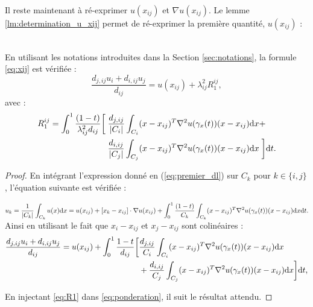 \documentclass[12pt,a4paper]{article}
\begin{document}
   Il reste maintenant à ré-exprimer $u(x_{ij})$ et $\nabla u(x_{ij})$. Le lemme \ref{lm:determination_u_xij} permet de ré-exprimer la première quantité, $u(x_{ij})$ : 
   
   
   \begin{lm}[Détermination de $u(x_{ij})$]$ $\label{lm:determination_u_xij}\\
   		En utilisant les notations introduites dans la Section \ref{sec:notations}, la formule \eqref{eq:xij} est vérifiée :
	   	\begin{equation}\label{eq:xij}
	   		\dfrac{d_{j,ij}u_i + d_{i,ij}u_j}{d_{ij}} = u(  x_{ij}) + \lambda_{ij}^2R_1^{ij},
	   	\end{equation}
	   	avec : 
   		\begin{equation}\label{eq:R1}
   			\begin{aligned}
   				R_1^{ij} =\displaystyle\int_0^1 \dfrac{(1-t)}{\lambda_{ij}^2d_{ij}}\bigg[\;&\dfrac{d_{j,ij}}{\left\lvert C_i \right\rvert}\int_{C_i}( {x-x_{ij}})^T\nabla^2 u(\gamma_x(t)) ( {x-x_{ij}})\mathrm d  x+\\
   				&\dfrac{d_{i,ij}}{\left\lvert C_j \right\rvert}\int_{C_j}( {x-x_{ij}})^T\nabla^2 u(\gamma_x(t)) ( {x-x_{ij}})\mathrm d  x \;\bigg] \mathrm dt .
   			\end{aligned}
	   	\end{equation}
   \end{lm}

   \begin{proof}
   		En intégrant l'expression donné en (\ref{eq:premier_dl}) sur $C_k$ pour $k \in\{i,j\}$, l'équation suivante est vérifiée :
   	
	   	$u_k = \dfrac1{\left\lvert C_k \right\rvert}\displaystyle\int_{C_k} u(x)\mathrm dx = u(  x_{ij}) + \left[  x_k-  x_{ij}\right]\cdot {\nabla u}(x_{ij}) + \int_0^1 \dfrac{(1-t)}{C_k}\int_{C_k}( {x-x_{ij}})^T\nabla^2 u(\gamma_x(t)) ( {x-x_{ij}})\mathrm d  x \mathrm dt.$\\
		
		Ainsi en utilisant le fait que $x_i-x_{ij}$ et $x_j-x_{ij}$ sont colinéaires : 
		\begin{equation}\label{eq:ponderation}
			\begin{aligned}
			\dfrac{d_{j,ij}u_i + d_{i,ij}u_j}{d_{ij}} = u(  x_{ij}) + \displaystyle\int_0^1 \dfrac{1-t}{d_{ij}}\bigg[&\dfrac{d_{j,ij}}{C_i}\int_{C_i}( {x-x_{ij}})^T\nabla^2 u(\gamma_x(t)) ( {x-x_{ij}})\mathrm d  x\\
			& + \dfrac{d_{i,ij}}{C_j}\int_{C_j}( {x-x_{ij}})^T\nabla^2 u(\gamma_x(t)) ( {x-x_{ij}})\mathrm d  x\bigg] \mathrm dt,
		\end{aligned}
		\end{equation}
		
		En injectant \eqref{eq:R1} dans \eqref{eq:ponderation}, il suit le résultat attendu.
	 \end{proof}
	 
\end{document}

